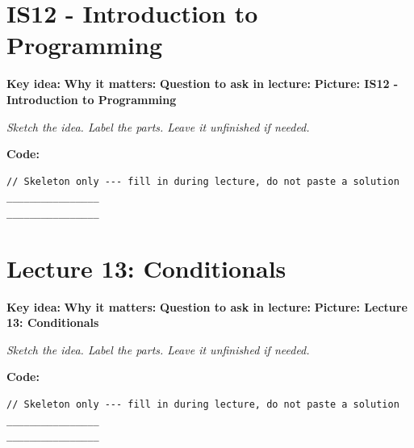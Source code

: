 \documentclass[14pt]{extarticle}
\newcommand{\deflabel}[1]{\noindent\textcolor{slotdef}{\textbf{#1}}}
\newcommand{\drawlabel}[1]{\noindent\textcolor{slotdraw}{\textbf{#1}}}
\begin{document}
\section{IS12 - Introduction to Programming}
\Needspace{0.16\textheight}
\deflabel{Key idea:}
\vspace{1.1em}
\Needspace{0.16\textheight}
\deflabel{Why it matters:}
\vspace{1.1em}
\Needspace{0.16\textheight}
\deflabel{Question to ask in lecture:}
\vspace{1.1em}
\Needspace{0.28\textheight}
\drawlabel{Picture: IS12 - Introduction to Programming}
{\color{slotdraw}
\begin{framed}
\color{ink}
\begin{minipage}[t][0.22\textheight]{\textwidth}
\vspace{0.4em}
\textit{Sketch the idea. Label the parts. Leave it unfinished if needed.}
\end{minipage}
\end{framed}
}
\vspace{1em}
\Needspace{0.18\textheight}
\drawlabel{Code:}
\begin{lstlisting}
// Skeleton only --- fill in during lecture, do not paste a solution
________________
________________
\end{lstlisting}
\vspace{1em}
\section{Lecture 13: Conditionals}
\Needspace{0.16\textheight}
\deflabel{Key idea:}
\vspace{1.1em}
\Needspace{0.16\textheight}
\deflabel{Why it matters:}
\vspace{1.1em}
\Needspace{0.16\textheight}
\deflabel{Question to ask in lecture:}
\vspace{1.1em}
\Needspace{0.28\textheight}
\drawlabel{Picture: Lecture 13: Conditionals}
{\color{slotdraw}
\begin{framed}
\color{ink}
\begin{minipage}[t][0.22\textheight]{\textwidth}
\vspace{0.4em}
\textit{Sketch the idea. Label the parts. Leave it unfinished if needed.}
\end{minipage}
\end{framed}
}
\vspace{1em}
\Needspace{0.18\textheight}
\drawlabel{Code:}
\begin{lstlisting}
// Skeleton only --- fill in during lecture, do not paste a solution
________________
________________
\end{lstlisting}
\vspace{1em}
\end{document}

